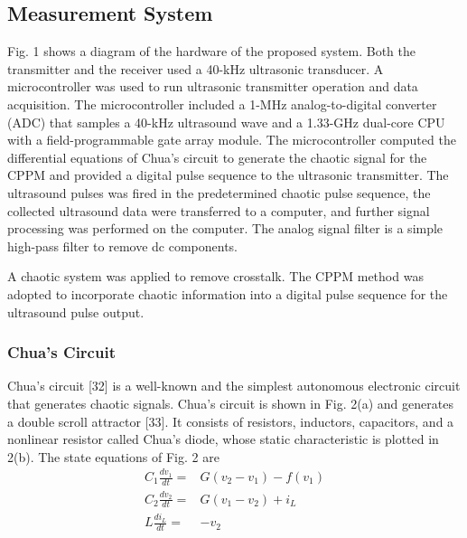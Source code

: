 \subsection{Measurement System}
Fig. 1 shows a diagram of the hardware of the proposed system. Both the transmitter and the receiver used a 40-kHz ultrasonic transducer. A microcontroller was used to run ultrasonic transmitter operation and data acquisition. The microcontroller included a 1-MHz analog-to-digital converter (ADC) that samples a 40-kHz ultrasound wave and a 1.33-GHz dual-core CPU with a field-programmable gate array module. The microcontroller computed the differential equations of Chua’s circuit to generate the chaotic signal for the CPPM and provided a digital pulse sequence to the ultrasonic transmitter. The ultrasound pulses was fired in the predetermined chaotic pulse sequence, the collected ultrasound data were transferred to a computer, and further signal processing was performed on the computer. The analog signal filter is a simple high-pass filter to remove dc components.

A chaotic system was applied to remove crosstalk. The CPPM method was adopted to incorporate chaotic information into a digital pulse sequence for the ultrasound pulse output.

\subsubsection{Chua’s Circuit}

Chua’s circuit [32] is a well-known and the simplest autonomous electronic circuit that generates chaotic signals. Chua’s circuit is shown in Fig. 2(a) and generates a double scroll attractor [33]. It consists of resistors, inductors, capacitors, and a nonlinear resistor called Chua’s diode, whose static characteristic is plotted in 2(b). The state equations of Fig. 2 are
\begin{align*} 
	C_{1} \frac {dv_{1}}{dt}=&G (v_{2} - v_{1}) - f(v_{1}) \\ C_{2} \frac {dv_{2}}{dt}=&G (v_{1} - v_{2}) + i_{L} \\ L \frac {di_{L}}{dt}=&-v_{2} \tag{4}
\end{align*}

